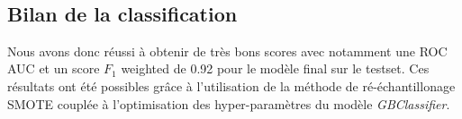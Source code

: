 \documentclass[11pt]{article}
\begin{document}
    \begin{center}
    \end{center}
    { \hspace*{\fill} \\}
    
    \hypertarget{bilan-de-la-classification}{%
\subsection{Bilan de la
classification}\label{bilan-de-la-classification}}

Nous avons donc réussi à obtenir de très bons scores avec notamment une
ROC AUC et un score \(F_1\) weighted de 0.92 pour le modèle final sur le
testset. Ces résultats ont été possibles grâce à l'utilisation de la
méthode de ré-échantillonage SMOTE couplée à l'optimisation des
hyper-paramètres du modèle \emph{GBClassifier}.


    
    
    
\end{document}
